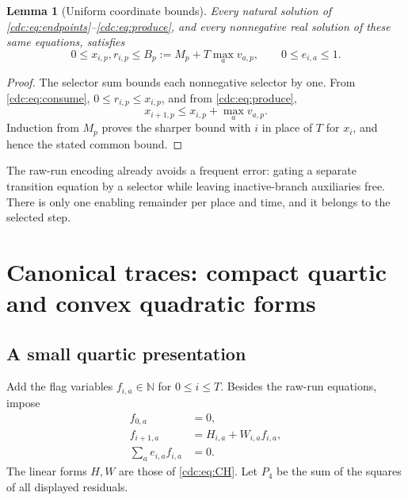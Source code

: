 \documentclass[11pt,a4paper]{article}
\newtheorem{lemma}[lemma]{Lemma}
\theoremstyle{definition}
\theoremstyle{remark}
\newcommand{\N}{\mathbb N}
\newcommand{\srctag}[1]{\texorpdfstring{\hspace{0.5em}{\normalfont\small\color{accent}[#1]}}{ [#1]}}
\begin{document}
\begin{lemma}[Uniform coordinate bounds]\label{cdc:lem:height}
Every natural solution of \eqref{cdc:eq:endpoints}--\eqref{cdc:eq:produce}, and every nonnegative real solution of these same equations, satisfies
\begin{equation}\label{cdc:eq:height}
0\le x_{i,p},r_{i,p}\le B_p:=M_p+T\max_a v_{a,p},
\qquad 0\le e_{i,a}\le1.
\end{equation}
\end{lemma}
\begin{proof}
The selector sum bounds each nonnegative selector by one. From \eqref{cdc:eq:consume}, $0\le r_{i,p}\le x_{i,p}$, and from \eqref{cdc:eq:produce},
\[
x_{i+1,p}\le x_{i,p}+\max_a v_{a,p}.
\]
Induction from $M_p$ proves the sharper bound with $i$ in place of $T$ for $x_i$, and hence the stated common bound.
\end{proof}

The raw-run encoding already avoids a frequent error: gating a separate transition equation by a selector while leaving inactive-branch auxiliaries free. There is only one enabling remainder per place and time, and it belongs to the selected step.

\section{Canonical traces: compact quartic and convex quadratic forms\srctag{05}}
\label{cdc:sec:main}
\subsection{A small quartic presentation}
Add the flag variables $f_{i,a}\in\N$ for $0\le i\le T$. Besides the raw-run equations, impose
\begin{align}
f_{0,a}&=0,\label{cdc:eq:fzero}\\
f_{i+1,a}&=H_{i,a}+W_{i,a}f_{i,a},\label{cdc:eq:frecur}\\
\sum_a e_{i,a}f_{i,a}&=0.\label{cdc:eq:reject}
\end{align}
The linear forms $H,W$ are those of \eqref{cdc:eq:CH}. Let $P_4$ be the sum of the squares of all displayed residuals.
\end{document}
